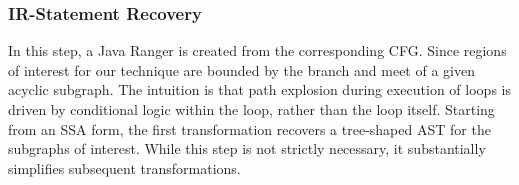 %
\subsubsection{IR-Statement Recovery}
In this step, a Java Ranger is created from the corresponding CFG. Since regions of interest for our technique are bounded by the branch and meet of a given acyclic subgraph.  The intuition is that path explosion during execution of loops is driven by conditional logic within the loop, rather than the loop itself.
Starting from an SSA form, the first transformation recovers a tree-shaped AST for the subgraphs of interest.  While this step is not strictly necessary, it substantially simplifies subsequent transformations.  

